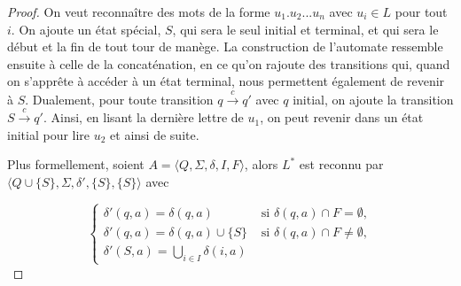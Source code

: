 \begin{proof}
On veut reconnaître des mots de la forme $u_1.u_2...u_n$ avec $u_i \in L$ pour tout $i$. On ajoute un état spécial, $S$, qui sera le seul initial et terminal, et qui sera le début et la fin de tout tour de manège. La construction de l'automate ressemble ensuite à celle de la concaténation, en ce qu'on rajoute des transitions qui, quand on s'apprête à accéder à un état terminal, nous permettent également de revenir à $S$. Dualement, pour toute transition $q \xrightarrow{c} q'$ avec $q$ initial, on ajoute la transition $S \xrightarrow{c} q'$. Ainsi, en lisant la dernière lettre de $u_1$, on peut revenir dans un état initial pour lire $u_2$ et ainsi de suite.

Plus formellement, soient $A = \big \langle Q, \Sigma, \delta, I, F\big \rangle$, alors $L^*$ est reconnu par $\big \langle Q \cup \{S\}, \Sigma, \delta', \{S\}, \{S\} \big \rangle$ avec 

\[
\begin{cases}
\delta'(q,a) = \delta(q,a) &\text{ si } \delta(q,a) \cap F = \emptyset,\\[1ex]
\delta'(q,a) = \delta(q,a) \cup \{S\} &\text{ si } \delta(q,a) \cap F \neq \emptyset,\\[1ex]
\delta'(S,a) = \displaystyle\bigcup_{i \in I} \delta(i,a) & 
\end{cases}
\]

\end{proof}

